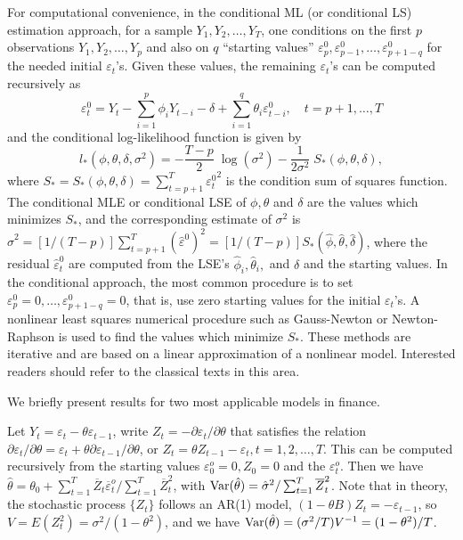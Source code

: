 For computational convenience, in the conditional ML (or conditional LS) estimation approach, for a sample $Y_1, Y_2, \ldots, Y_T$, one conditions on the first $p$ observations $Y_1,Y_2, \ldots, Y_p$ and also on $q$ ``starting values'' $\varepsilon_p^0, \varepsilon_{p-1}^0,\ldots,\varepsilon_{p+1-q}^0$ for the needed initial $\varepsilon_t$'s. Given these values, the remaining $\varepsilon_t$'s can be computed recursively as
	\[
	\varepsilon_t^0 = Y_t - \sum_{i=1}^p\phi_iY_{t-i} - \delta + \sum_{i=1}^q\theta_i\varepsilon_{t-i}^0, \quad t= p+1, \ldots, T
	\]
and the conditional log-likelihood function is given by
	\begin{equation} \label{eqn:llowstar}
	l_*(\phi,\theta,\delta,\sigma^2) = -\dfrac{T - p}{2}\; \log(\sigma^2) - \dfrac{1}{2\sigma^2} \;S_*(\phi,\theta,\delta),
	\end{equation}
where $S_* = S_*(\phi,\theta,\delta) = \sum_{t=p+1}^T {\varepsilon_t^0}^2$ is the condition sum of squares function. The conditional MLE or conditional LSE of $\phi,\theta$ and $\delta$ are the values which minimizes $S_*$, and the corresponding estimate of $\sigma^2$ is $\hat{\sigma}^2 = [1/(T - p)]\sum_{t=p+1}^T (\hat{\varepsilon}^0)^2 = [1/(T - p)]S_*(\hat{\phi},\hat{\theta},\hat{\delta})$, where the residual $\hat{\varepsilon}_t^0$ are computed from the LSE's $\hat{\phi}_i,\hat{\theta}_i,$ and $\delta$ and the starting values. In the conditional approach, the most common procedure is to set $\varepsilon_p^0 = 0,\ldots,\varepsilon_{p+1-q}^0 = 0$, that is, use zero starting values for the initial $\varepsilon_t$'s. A nonlinear least squares numerical procedure such as Gauss-Newton or Newton-Raphson is used to find the values which minimize $S_*$. These methods are iterative and are based on a linear approximation of a nonlinear model. Interested readers should refer to the classical texts in this area.


We briefly present results for two most applicable models in finance.


\begin{ex}[MA(1) Model)]
Let $Y_t = \varepsilon_t - \theta\varepsilon_{t-1}$, write $Z_t = -\partial\varepsilon_t/\partial\theta$ that satisfies the relation $\partial\varepsilon_t/\partial\theta = \varepsilon_t + \theta\partial\varepsilon_{t-1}/\partial\theta$, or $Z_t = \theta Z_{t-1} - \varepsilon_t, t = 1,2,\ldots,T$. This can be computed recursively from the starting values $\varepsilon_0^o = 0, Z_0 = 0$ and the $\varepsilon_t^o$. Then we have $\hat{\theta} = \theta_0 + \sum_{t=1}^T\overline{Z}_t\overline{\varepsilon}_t^o/\sum_{t=1}^T\overline{Z}_t^2$, with $\operatorname{Var}(\hat{\theta}) = \hat{\sigma}^2/\sum_{t=1}^T\overline{Z}_t^2$. Note that in theory, the stochastic process $\{Z_t\}$ follows an AR(1) model, $(1 - \theta B)Z_t = -\varepsilon_{t-1}$, so $V = E(Z_t^2) = \sigma^2/(1 - \theta^2)$, and we have $\operatorname{Var}(\hat{\theta}) = (\sigma^2/T)V^{-1} = (1 - \theta^2)/T$. \xqed
\end{ex}


